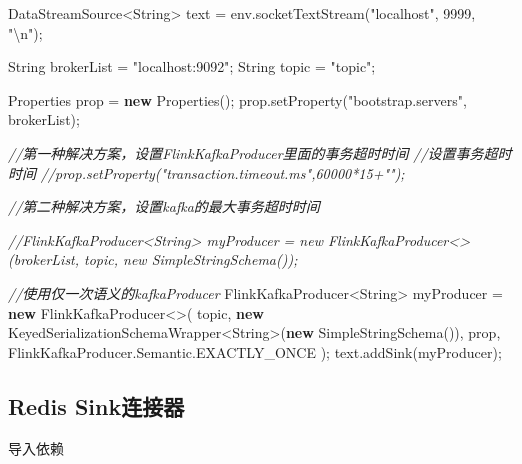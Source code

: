 \documentclass[cn,11pt,chinese]{elegantbook}
\newenvironment{Shaded}{}{}
\newcommand{\BuiltInTok}[1]{#1}
\newcommand{\CommentTok}[1]{\textcolor[rgb]{0.38,0.63,0.69}{\textit{#1}}}
\newcommand{\DecValTok}[1]{\textcolor[rgb]{0.25,0.63,0.44}{#1}}
\newcommand{\FunctionTok}[1]{\textcolor[rgb]{0.02,0.16,0.49}{#1}}
\newcommand{\KeywordTok}[1]{\textcolor[rgb]{0.00,0.44,0.13}{\textbf{#1}}}
\newcommand{\NormalTok}[1]{#1}
\newcommand{\SpecialCharTok}[1]{\textcolor[rgb]{0.25,0.44,0.63}{#1}}
\newcommand{\StringTok}[1]{\textcolor[rgb]{0.25,0.44,0.63}{#1}}
\begin{document}
\begin{Shaded}
\begin{Highlighting}[]
\NormalTok{DataStreamSource\textless{}}\BuiltInTok{String}\NormalTok{\textgreater{} text = env.}\FunctionTok{socketTextStream}\NormalTok{(}\StringTok{"localhost"}\NormalTok{, }\DecValTok{9999}\NormalTok{, }\StringTok{"}\SpecialCharTok{\textbackslash{}n}\StringTok{"}\NormalTok{);}

\BuiltInTok{String}\NormalTok{ brokerList = }\StringTok{"localhost:9092"}\NormalTok{;}
\BuiltInTok{String}\NormalTok{ topic = }\StringTok{"topic"}\NormalTok{;}

\BuiltInTok{Properties}\NormalTok{ prop = }\KeywordTok{new} \BuiltInTok{Properties}\NormalTok{();}
\NormalTok{prop.}\FunctionTok{setProperty}\NormalTok{(}\StringTok{"bootstrap.servers"}\NormalTok{, brokerList);}

\CommentTok{//第一种解决方案，设置FlinkKafkaProducer里面的事务超时时间}
\CommentTok{//设置事务超时时间}
\CommentTok{//prop.setProperty("transaction.timeout.ms",60000*15+"");}

\CommentTok{//第二种解决方案，设置kafka的最大事务超时时间}

\CommentTok{//FlinkKafkaProducer\textless{}String\textgreater{} myProducer = new FlinkKafkaProducer\textless{}\textgreater{}(brokerList, topic, new SimpleStringSchema());}

\CommentTok{//使用仅一次语义的kafkaProducer}
\NormalTok{FlinkKafkaProducer\textless{}}\BuiltInTok{String}\NormalTok{\textgreater{} myProducer = }\KeywordTok{new}\NormalTok{ FlinkKafkaProducer\textless{}\textgreater{}(}
\NormalTok{    topic,}
    \KeywordTok{new}\NormalTok{ KeyedSerializationSchemaWrapper\textless{}}\BuiltInTok{String}\NormalTok{\textgreater{}(}\KeywordTok{new} \FunctionTok{SimpleStringSchema}\NormalTok{()),}
\NormalTok{    prop,}
\NormalTok{    FlinkKafkaProducer.}\FunctionTok{Semantic}\NormalTok{.}\FunctionTok{EXACTLY\_ONCE}
\NormalTok{);}
\NormalTok{text.}\FunctionTok{addSink}\NormalTok{(myProducer);}
\end{Highlighting}
\end{Shaded}

\hypertarget{redis-sinkux8fdeux63a5ux5668}{%
\subsection{Redis Sink连接器}\label{redis-sinkux8fdeux63a5ux5668}}

导入依赖

\begin{Shaded}
\end{Shaded}
\end{document}
